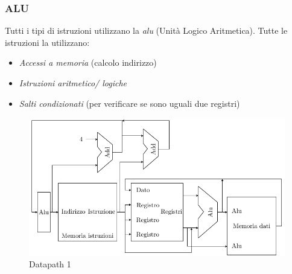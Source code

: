 \subsubsection*{ALU}
Tutti i tipi di istruzioni utilizzano la \textit{alu} (Unità Logico Aritmetica).
Tutte le istruzioni la utilizzano:
\begin{itemize}
	\item \textit{Accessi a memoria} (calcolo indirizzo)
	\item \textit{Istruzioni aritmetico/ logiche}
	\item \textit{Salti condizionati} (per verificare se sono uguali due registri)
\end{itemize}
\begin{figure}[H]
	\begin{center}
		\includegraphics{Images/Datapath1.pdf}
	\end{center}
	\caption{Datapath 1}
\end{figure}
